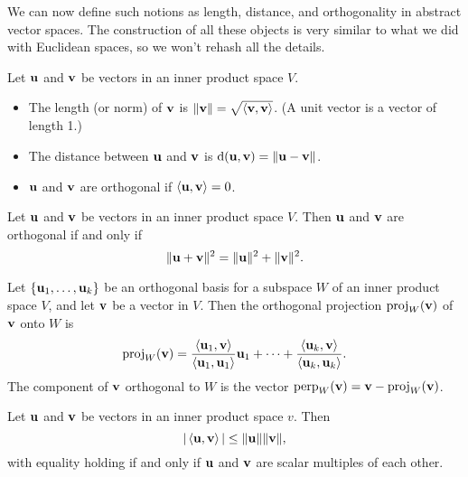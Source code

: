 \documentclass[../m073main.tex]{subfiles}
\begin{document}
We can now define such notions as length, distance, and orthogonality in abstract vector spaces.
The construction of all these objects is very similar to what we did with Euclidean spaces, so we won't rehash all the details.

\begin{definition}
	Let $\mathbf{u}$ and $\mathbf{v}$ be vectors in an inner product space $V$.
	\begin{itemize}[topsep=0pt]
		\item The length (or norm) of $\mathbf{v}$ is $\|\mathbf{v}\| = \sqrt{\left< \mathbf{v}, \mathbf{v} \right>}$.
		(A unit vector is a vector of length 1.)
		\item The distance between $\mathbf{u}$ and $\mathbf{v}$ is $\operatorname{d}(\mathbf{u}, \mathbf{v}) = \|\mathbf{u} - \mathbf{v}\|$.
		\item $\mathbf{u}$ and $\mathbf{v}$ are orthogonal if $\left< \mathbf{u}, \mathbf{v} \right> = 0$.
	\end{itemize}
\end{definition}

\begin{theorem}
	Let $\mathbf{u}$ and $\mathbf{v}$ be vectors in an inner product space $V$.
	Then $\mathbf{u}$ and $\mathbf{v}$ are orthogonal if and only if
	\[ \|\mathbf{u} + \mathbf{v}\|^2 = \|\mathbf{u}\|^2 + \|\mathbf{v}\|^2. \]
\end{theorem}

\begin{definition}
	Let $\{\mathbf{u}_1, \ldots, \mathbf{u}_k\}$ be an orthogonal basis for a subspace $W$ of an inner product space $V$, and let $\mathbf{v}$ be a vector in $V$.
	Then the orthogonal projection $\operatorname{proj}_W(\mathbf{v})$ of $\mathbf{v}$ onto $W$ is
	\[ \operatorname{proj}_W(\mathbf{v}) = \frac{\left< \mathbf{u}_1, \mathbf{v} \right>}{\left< \mathbf{u}_1, \mathbf{u}_1 \right>} \mathbf{u}_1 + \cdots + \frac{\left< \mathbf{u}_k, \mathbf{v} \right>}{\left< \mathbf{u}_k, \mathbf{u}_k \right>}. \]
	The component of $\mathbf{v}$ orthogonal to $W$ is the vector $\operatorname{perp}_W(\mathbf{v}) = \mathbf{v} - \operatorname{proj}_W(\mathbf{v})$.
\end{definition}

\begin{theorem}
	Let $\mathbf{u}$ and $\mathbf{v}$ be vectors in an inner product space $v$.
	Then
	\[ |\left< \mathbf{u}, \mathbf{v} \right>| \leq \|\mathbf{u}\| \|\mathbf{v}\|, \]
	with equality holding if and only if $\mathbf{u}$ and $\mathbf{v}$ are scalar multiples of each other.
\end{theorem}
\end{document}
